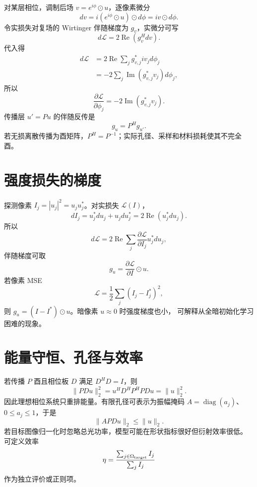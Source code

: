 \documentclass[11pt]{article}
\numberwithin{equation}{section}
\newcommand{\1}{\mathbf{1}}
\newcommand{\cL}{\mathcal{L}}
\newcommand{\diag}{\operatorname{diag}}
\begin{document}
对某层相位，调制后场 $v=e^{i\phi}\odot u$，逐像素微分
\begin{equation}
 dv=i(e^{i\phi}\odot u)\odot d\phi=i v\odot d\phi.
\end{equation}
令实损失对复场的 Wirtinger 伴随梯度为 $g_v$，实微分可写
\begin{equation}
 d\cL=2\operatorname{Re}(g_v^Hdv).
\end{equation}
代入得
\begin{align}
 d\cL
 &=2\operatorname{Re}\sum_jg_{v,j}^*iv_jd\phi_j\\
 &=-2\sum_j\operatorname{Im}(g_{v,j}^*v_j)d\phi_j,
\end{align}
所以
\begin{equation}
 \boxed{\frac{\partial\cL}{\partial\phi_j}
 =-2\operatorname{Im}(g_{v,j}^*v_j).}
\end{equation}
传播层 $u'=Pu$ 的伴随反传是
\begin{equation}
 g_u=P^Hg_{u'}.
\end{equation}
若无损离散传播为酉矩阵，$P^H=P^{-1}$；实际孔径、采样和材料损耗使其不完全酉。

\section{强度损失的梯度}

探测像素 $I_j=|u_j|^2=u_ju_j^*$。对实损失
$\cL(I)$，
\begin{equation}
 dI_j=u_j^*du_j+u_jdu_j^*=2\operatorname{Re}(u_j^*du_j).
\end{equation}
所以
\begin{equation}
 d\cL=2\operatorname{Re}\sum_j
 \frac{\partial\cL}{\partial I_j}u_j^*du_j,
\end{equation}
伴随梯度可取
\begin{equation}
 g_u=\frac{\partial\cL}{\partial I}\odot u.
\end{equation}
若像素 MSE
\begin{equation}
 \cL=\frac12\sum_j(I_j-I_j^*)^2,
\end{equation}
则 $g_u=(I-I^*)\odot u$。暗像素 $u\approx0$ 时强度梯度也小，
可解释从全暗初始化学习困难的现象。

\section{能量守恒、孔径与效率}

若传播 $P$ 酉且相位板 $D$ 满足 $D^HD=I$，则
\begin{equation}
 \|PDu\|_2^2=u^HD^HP^HPDu=\|u\|_2^2.
\end{equation}
因此理想相位系统只重排能量。有限孔径可表示为振幅掩码
$A=\diag(a_j)$、$0\le a_j\le1$，于是
\begin{equation}
 \|APDu\|_2\le\|u\|_2.
\end{equation}
若目标图像归一化时忽略总光功率，模型可能在形状指标很好但衍射效率很低。
可定义效率
\begin{equation}
 \eta=\frac{\sum_{j\in\Omega_{\rm target}}I_j}
 {\sum_jI_j}
\end{equation}
作为独立评价或正则项。
\end{document}
